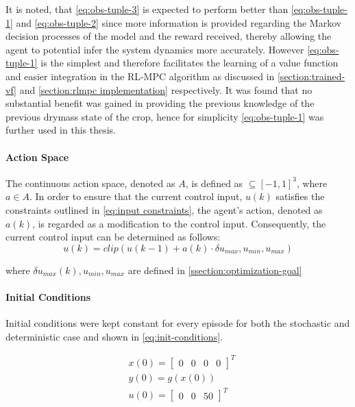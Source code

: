 It is noted, that \autoref{eq:obs-tuple-3} is expected to perform better than \autoref{eq:obs-tuple-1} and \autoref{eq:obs-tuple-2} since more information is provided regarding the Markov decision processes of the model and the reward received, thereby allowing the agent to potential infer the system dynamics more accurately. However \autoref{eq:obs-tuple-1} is the simplest and therefore facilitates the learning of a value function and easier integration in the RL-MPC algorithm as discussed in \autoref{section:trained-vf} and \autoref{section:rlmpc implementation} respectively. It was found that no substantial benefit was gained in providing the previous knowledge of the previous drymass state of the crop, hence for simplicity \autoref{eq:obs-tuple-1} was further used in this thesis.

\paragraph{Action Space}
The continuous action space, denoted as $A$, is defined as $ \subseteq [-1,1]^3$, where $a \in A$. In order to ensure that the current control input, $u(k)$ satisfies the constraints outlined in  \autoref{eq:input constraints}, the agent's action, denoted as $a(k)$, is regarded as a modification to the control input. Consequently, the current control input can be determined as follows:
$$
u(k) = clip(u(k-1) + a(k) \cdot \delta u_{max},u_{min}, u_{max})
$$

where $\delta u_{max}(k),u_{min}, u_{max}$ are defined in \autoref{ssection:optimization-goal}

\paragraph{Initial Conditions}
Initial conditions were kept constant for every episode for both the stochastic and deterministic case and shown in \autoref{eq:init-conditions}.

\begin{equation}
    \label{eq:init-conditions}
    \begin{aligned}
        &x(0) = \begin{bmatrix}
            0 & 0 & 0 & 0
        \end{bmatrix}^T \\
        &y(0) = g(x(0)) \\
        &u(0) = \begin{bmatrix}
            0 & 0 & 50
        \end{bmatrix}^T
    \end{aligned}
\end{equation}

